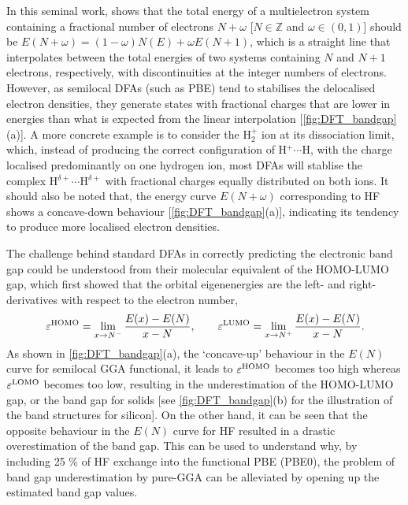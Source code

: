 In this seminal work, \citet{perdew1982density} shows that the total energy of a multielectron system containing a fractional number of electrons $N+\omega$ [$N\in \mathbb{Z}$ and $\omega \in (0,1)$] should be $E(N+\omega)=(1-\omega)N(E)+\omega E(N+1)$, which is a straight line that interpolates between the total energies of two systems containing $N$ and $N+1$ electrons, respectively, with discontinuities at the integer numbers of electrons. However, as semilocal DFAs (such as PBE) tend to stabilises the delocalised electron densities, they generate states with fractional charges that are lower in energies than what is expected from the linear interpolation [\cref{fig:DFT_bandgap}(a)]. A more concrete example is to consider the H$_{2}^{+}$ ion at its dissociation limit, which, instead of producing the correct configuration of H$^{+}\cdots$H, with the charge localised predominantly on one hydrogen ion, most DFAs will stablise the complex  H$^{\delta +}\cdots$H$^{\delta +}$ with fractional charges equally distributed on both ions. It should also be noted that, the energy curve $E(N+\omega)$ corresponding to HF shows a concave-down behaviour [\cref{fig:DFT_bandgap}(a)], indicating its tendency to produce more localised electron densities.

The challenge behind standard DFAs in correctly predicting the electronic band gap could be understood from their molecular equivalent of the HOMO-LUMO gap, which \citet{janak1978proof} first showed that the orbital eigenenergies are the left- and right-derivatives with respect to the electron number,
\begin{equation}\label{eq:HOMO_LUMO_def}
\varepsilon^{\mbox{\scriptsize{HOMO}}}=\lim_{x\to N^{-}}\frac{E(x)-E(N)}{x-N},\qquad \varepsilon^{\mbox{\scriptsize{LUMO}}}=\lim_{x\to N^{+}}\frac{E(x)-E(N)}{x-N}.
\end{equation}
As shown in \cref{fig:DFT_bandgap}(a), the `concave-up' behaviour in the $E(N)$ curve for semilocal GGA functional, it leads to $\varepsilon^{\mbox{\scriptsize{HOMO}}}$ becomes too high whereas $\varepsilon^{\mbox{\scriptsize{LOMO}}}$
becomes too low, resulting in the underestimation of the HOMO-LUMO gap, or the band gap for solids [see \cref{fig:DFT_bandgap}(b) for the illustration of the band structures for silicon]. On the other hand, it can be seen that the opposite behaviour in the $E(N)$ curve for HF resulted in a drastic overestimation of the band gap. This can be used to understand why, by including 25 \% of HF exchange into the functional PBE (PBE0),\cite{adamo1999toward} the problem of band gap underestimation by pure-GGA can be alleviated by opening up the estimated band gap values.

